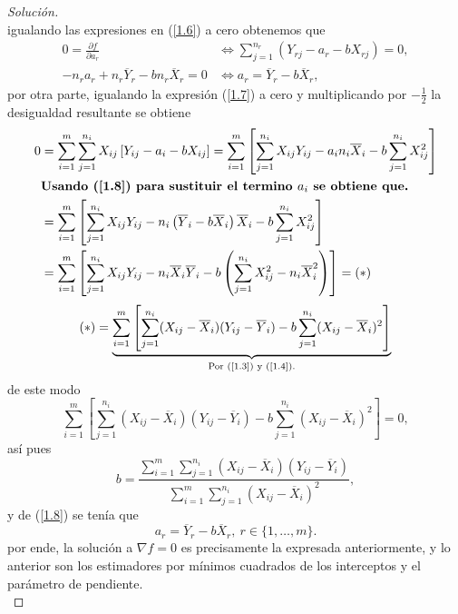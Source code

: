 \documentclass[10.5pt,notitlepage]{article}
\newenvironment{solucion}
  {\begin{proof}[Solución]}
  {\end{proof}}
\newcommand{\corch}[1]{\left[ #1 \right]}
\newcommand{\pare}[1]{\left( #1 \right)}
\begin{document}
\begin{solucion}
\begin{equation}
\end{equation}
igualando las expresiones en (\ref{1.6}) a cero obtenemos que 
\begin{align}
     0 =  \frac{\partial f}{\partial a_r} &\iff  \sum_{j = 1}^{n_r}(Y_{rj} - a_r - b X_{rj}) = 0,\nonumber\\ 
     -n_r a_r + n_r \overline{Y}_r - b n_r\overline{X}_r =0 &\iff a_r = \overline{Y}_r - b\overline{X}_r, \label{1.8} 
\end{align}
por otra parte, igualando la expresión (\ref{1.7}) a cero y multiplicando por \(- \frac{1}{2}\) la desigualdad resultante se obtiene 
\begin{align}
    0 &= \sum_{i = 1}^{m}\sum_{j=1}^{n_i}X_{ij}\corch{Y_{ij} - a_i - bX_{ij}} = \sum_{i = 1}^{m}\corch{\sum_{j=1}^{n_i}X_{ij}Y_{ij} - a_in_i\overline{X}_i - b\sum_{j = 1}^{n_i}X_{ij}^2} \nonumber\\ 
      &\textbf{Usando (\ref{1.8}) para sustituir el termino \(a_i\) se obtiene que.}\nonumber\\
      &=\sum_{i = 1}^{m}\corch{\sum_{j=1}^{n_i}X_{ij}Y_{ij} - n_i\pare{\overline{Y}_i - b\overline{X}_i}\overline{X}_i - b\sum_{j = 1}^{n_i}X_{ij}^2} \nonumber\\ 
      &=\sum_{i = 1}^{m}\corch{\sum_{j=1}^{n_i}X_{ij}Y_{ij} -n_i\overline{X}_i\overline{Y}_i - b\pare{\sum_{j = 1}^{n_i}X_{ij}^2 - n_i\overline{X}_{i}^{2}} } = (*)\nonumber
\end{align}  
\begin{align}
     (*) &=\underbrace{\sum_{i = 1}^{m}\corch{\sum_{j = 1}^{n_i}(X_{ij} - \overline{X}_i)(Y_{ij} - \overline{Y}_i) - b\sum_{j = 1}^{n_i}(X_{ij} - \overline{X}_i)^2 }}_{\text{Por (\ref{1.3}) y (\ref{1.4}).}}\nonumber\\ 
\end{align}
de este modo 
\[
\sum_{i = 1}^{m}\corch{\sum_{j = 1}^{n_i}(X_{ij} - \overline{X}_i)(Y_{ij} - \overline{Y}_i) - b\sum_{j = 1}^{n_i}(X_{ij} - \overline{X}_i)^2 } = 0,
\]
así pues
\begin{equation}\label{1.9}
    b = \frac{\sum_{i=1}^{m}\sum_{j = 1}^{n_i}(X_{ij} - \overline{X}_i)(Y_{ij} - \overline{Y}_i)}{\sum_{i=1}^{m}\sum_{j = 1}^{n_i}(X_{ij} - \overline{X}_i)^2},
\end{equation}
y de (\ref{1.8}) se tenía que 
\[
  a_r = \overline{Y}_r - b\overline{X}_r, \ r\in\{1,\hdots,m\}. 
\]
por ende, la solución a \(\nabla f = 0\) es precisamente la expresada anteriormente, y lo anterior son los estimadores por mínimos cuadrados de los interceptos y el parámetro de pendiente. \\ 


\end{solucion}
\end{document}
